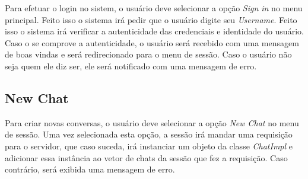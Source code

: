 \documentclass[../main.tex]{subfiles}
\begin{document}
Para efetuar o login no sistem, o usuário deve selecionar a opção \textit{Sign in} no menu principal.
Feito isso o sistema irá pedir que o usuário digite seu \textit{Username}. Feito isso o sistema irá verificar a autenticidade das credenciais e identidade do usuário. Caso o se comprove a autenticidade, o usuário será recebido com uma mensagem de boas vindas e será redirecionado para o menu de sessão. Caso o usuário não seja quem ele diz ser, ele será notificado com uma mensagem de erro.

\subsection{New Chat}

Para criar novas conversas, o usuário deve selecionar a opção \textit{New Chat} no menu de sessão.
Uma vez selecionada esta opção, a sessão irá mandar uma requisição para o servidor, que caso suceda, irá instanciar um objeto da classe \textit{ChatImpl} e adicionar essa instância ao vetor de chats da sessão que fez a requisição. Caso contrário, será exibida uma mensagem de erro.
\end{document}
